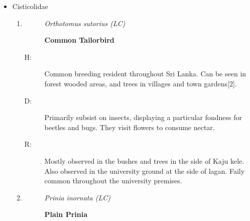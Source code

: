 \begin{itemize}
\begin{enumerate}
\item%
\begin{description}%
\item[]%
\textit{Mycteria leucocephala (LC)}%
\item[]%
\textbf{Painted Stork}%
\end{description}%
\begin{description}%
\item[H: ]%
Fairly common breeding resident in dry lowlands. An introduced population can be observed in and the suburbs of Colombo. Marshes,tanks and lagoons are the places to look for{[}2{]}.%
\item[D: ]%
Primary diet consists of small fish, and they also consume crustaceans, amphibians, insects, frogs in their diet and occasionally prey on snakes.%
\item[R: ]%
boat yard and the surrounding areas of Bolgoda lake. Documented only once.%
\end{description}%
\end{enumerate}%
\item%
Cisticolidae%
\begin{enumerate}%
\item%
\begin{description}%
\item[]%
\textit{Orthotomus sutorius (LC)}%
\item[]%
\textbf{Common Tailorbird}%
\end{description}%
\begin{description}%
\item[H: ]%
Common breeding resident throughout Sri Lanka. Can be seen in forest wooded areas, and trees in villages and town gardens{[}2{]}.%
\item[D: ]%
Primarily subsist on insects, displaying a particular fondness for beetles and bugs. They visit flowers to consume nectar.%
\item[R: ]%
Mostly observed in the bushes and trees in the side of Kaju kele. Also observed in the university ground at the side of lagan. Faily common throughout the university premises.%
\end{description}%
\item%
\begin{description}%
\item[]%
\textit{Prinia inornata (LC)}%
\item[]%
\textbf{Plain Prinia}%
\end{description}%
\begin{description}%

\end{description}
\end{enumerate}
\end{itemize}

